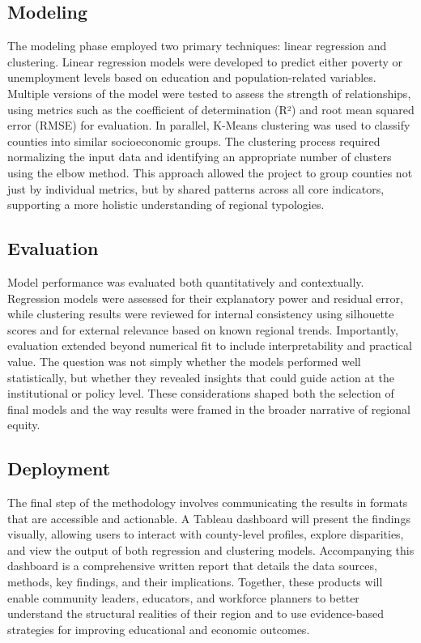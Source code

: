 \documentclass[12pt]{llncs}
\begin{document}
\subsection{Modeling}
The modeling phase employed two primary techniques: linear regression and clustering. Linear regression models were developed to predict either poverty or unemployment levels based on education and population-related variables. Multiple versions of the model were tested to assess the strength of relationships, using metrics such as the coefficient of determination (R²) and root mean squared error (RMSE) for evaluation. In parallel, K-Means clustering was used to classify counties into similar socioeconomic groups. The clustering process required normalizing the input data and identifying an appropriate number of clusters using the elbow method. This approach allowed the project to group counties not just by individual metrics, but by shared patterns across all core indicators, supporting a more holistic understanding of regional typologies.
\subsection{Evaluation}
Model performance was evaluated both quantitatively and contextually. Regression models were assessed for their explanatory power and residual error, while clustering results were reviewed for internal consistency using silhouette scores and for external relevance based on known regional trends. Importantly, evaluation extended beyond numerical fit to include interpretability and practical value. The question was not simply whether the models performed well statistically, but whether they revealed insights that could guide action at the institutional or policy level. These considerations shaped both the selection of final models and the way results were framed in the broader narrative of regional equity.
\subsection{Deployment}
The final step of the methodology involves communicating the results in formats that are accessible and actionable. A Tableau dashboard will present the findings visually, allowing users to interact with county-level profiles, explore disparities, and view the output of both regression and clustering models. Accompanying this dashboard is a comprehensive written report that details the data sources, methods, key findings, and their implications. Together, these products will enable community leaders, educators, and workforce planners to better understand the structural realities of their region and to use evidence-based strategies for improving educational and economic outcomes.
\end{document}
